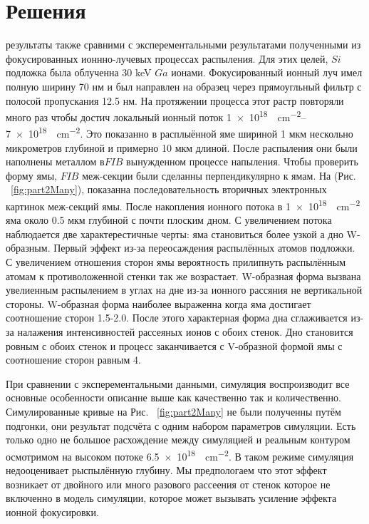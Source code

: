 \documentclass[a4paper,fontsize=12pt]{article}
\begin{document}
\section{Решения}


\ion{} результаты также сравними с эксперементальными результатами полученными из фокусированных ионнно-лучевых процессах распыления. Для этих целей, $Si$ подложка была облученна 30 keV $Ga$ ионами. Фокусированный ионный луч имел полную ширину 70 нм и был направлен на образец через прямоугльный фильтр с полосой пропускания 12.5 нм. На протяжении процесса этот растр повторяли много раз чтобы достич локальный ионный поток \SIrange[per-mode=fraction]{1e18}{7e18}{\siion\per\square\centi\meter}. Это показанно в расплыённой яме шириной 1 мкм нескольно микрометров глубиной и примерно 10 мкм длиной. После распыления они были наполнены металлом в$FIB$ вынужденном процессе напыления. Чтобы проверить форму ямы, $FIB$ меж-секции были сделанны перпендикулярно к ямам. На (Рис. ~\ref{fig:part2Many}), показанна последовательность вторичных электронных картинок меж-секций ямы. После накопления ионного потока в \SI[per-mode=fraction]{1e18}{\siion\per\square\centi\meter} яма около 0.5 мкм глубиной с почти плоским дном. С увеличением потока наблюдается две характерестичные черты: яма становиться более узкой а дно W-образным. Первый эффект из-за переосаждения распылённых атомов подложки. С увеличением отношения сторон ямы вероятность прилипнуть распылённым атомам к противоложенной стенки так же возрастает. W-образная форма вызвана увелиенным распылением в углах на дне из-за ионного рассяния  не вертикальной стороны. W-образная форма наиболее выраженна когда яма достигает соотношение сторон 1.5-2.0. После этого характерная форма дна сглаживается из-за налажения интенсивностей рассеяных ионов с обоих стенок. Дно становится ровным с обоих стенок и процесс заканчивается с V-образной формой ямы с соотношение сторон равным 4.



При сравнении с эксперементальными данными, симуляция воспроизводит все основные особенности описанне выше как качественно так и количественно. Симулированные кривые на Рис. ~\ref{fig:part2Many} не были полученны путём подгонки, они результат подсчёта с одним набором параметров симуляции. Есть только одно не большое расхождение между симуляцией и реальным контуром осмотримом на высоком потоке \SI[per-mode=fraction]{6.5e18}{\siion\per\square\centi\meter}. В таком режиме симуляция недооценивает рыспылённую глубину. Мы предпологаем что этот эффект возникает от двойного или много разового рассеения от стенок которое не включенно в \ion{} модель симуляции, которое может вызывать усиление эффекта ионной фокусировки.
\end{document}
